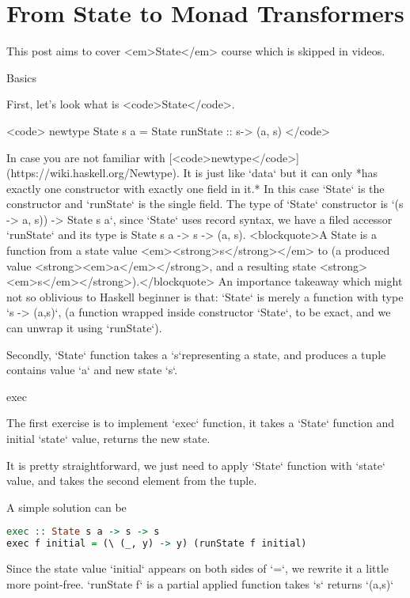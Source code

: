 \chapter{From State to Monad Transformers}

This post aims to cover <em>State</em> course which is skipped in videos.

 Basics

First, let's look what is <code>State</code>.

<code>
newtype State s a = State { runState :: s-> (a, s)}
</code>

In case you are not familiar with [<code>newtype</code>](https://wiki.haskell.org/Newtype). It is just like `data` but it can only *has exactly one constructor with exactly one field in it.* In this case `State` is the constructor and `runState` is the single field. The type of `State` constructor is `(s ->  a, s)) -> State s a`, since `State` uses record syntax, we have a filed accessor `runState` and its type is State s a -> s -> (a, s).
<blockquote>A State is a function from a state value <em><strong>s</strong></em> to (a produced value <strong><em>a</em></strong>, and a resulting state <strong><em>s</em></strong>).</blockquote>
An importance takeaway which might not so oblivious to Haskell beginner is that: `State` is merely a function with type `s -> (a,s)`, (a function wrapped inside constructor `State`, to be exact, and we can unwrap it using `runState`).

Secondly, `State` function takes a `s`representing a state, and produces a tuple contains value `a` and new state `s`.

 exec

The first exercise is to implement `exec` function, it takes a `State` function and initial `state` value, returns the new state.

It is pretty straightforward, we just need to apply `State` function with `state` value, and takes the second  element from the tuple.

A simple solution can be

\begin{lstlisting}[language=haskell]
exec :: State s a -> s -> s
exec f initial = (\ (_, y) -> y) (runState f initial)
\end{lstlisting}

Since the state value `initial` appears on both sides of `=`, we rewrite it a little more point-free. `runState f` is a partial applied function takes `s` returns `(a,s)`

